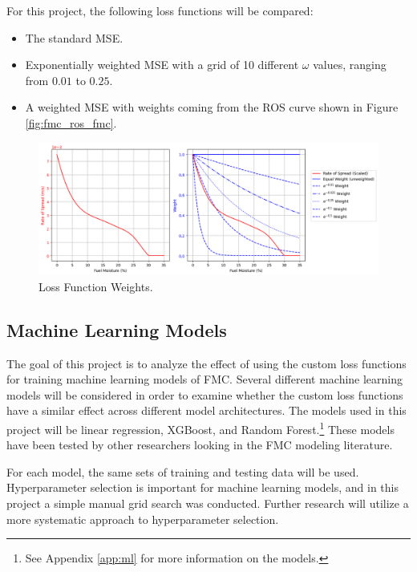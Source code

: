 \documentclass[11pt]{article}%
\begin{document}
For this project, the following loss functions will be compared:

\begin{itemize}
    \item The standard MSE.
    \item Exponentially weighted MSE with a grid of 10 different $\omega$ values, ranging from $0.01$ to $0.25$.
    \item A weighted MSE with weights coming from the ROS curve shown in Figure \ref{fig:fmc_ros_fmc}.
\end{itemize}

\begin{figure}[ht]
    \centering
    \includegraphics[width=1.1\textwidth]{images/weights.png}
    \caption{Loss Function Weights.}
    \label{fig:weights}
\end{figure}



\subsection{Machine Learning Models}

The goal of this project is to analyze the effect of using the custom loss functions for training machine learning models of FMC. Several different machine learning models will be considered in order to examine whether the custom loss functions have a similar effect across different model architectures. The models used in this project will be linear regression, XGBoost, and Random Forest.\footnote{See Appendix \ref{app:ml} for more information on the models.} These models have been tested by other researchers looking in the FMC modeling literature. \cite{Lee-2020-EFM,McCandless-2020-EWS, Schreck-2023-MLV}

For each model, the same sets of training and testing data will be used. Hyperparameter selection is important for machine learning models, and in this project a simple manual grid search was conducted. Further research will utilize a more systematic approach to hyperparameter selection. 
\end{document}

